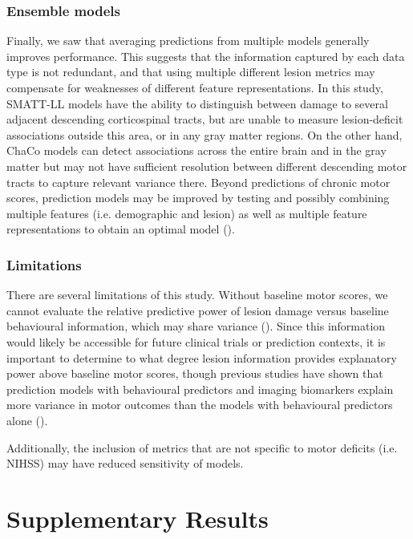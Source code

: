 \documentclass[10pt]{article}
\begin{document}
\subsubsection*{Ensemble models}
Finally, we saw that averaging predictions from multiple models generally improves performance. This suggests that the information captured by each data type is not redundant, and that using multiple different lesion metrics may compensate for weaknesses of different feature representations. In this study, SMATT-LL models have the ability to distinguish between damage to several adjacent descending corticospinal tracts, but are unable to measure lesion-deficit associations outside this area, or in any gray matter regions. On the other hand, ChaCo models can detect associations across the entire brain and in the gray matter but may not have sufficient resolution between different descending motor tracts to capture relevant variance there. Beyond predictions of chronic motor scores, prediction models may be improved by testing and possibly combining multiple features (i.e. demographic and lesion) as well as multiple feature representations to obtain an optimal model (\cite{Kasties2021-rm, Park2022-nt}).

\subsubsection*{Limitations}
There are several limitations of this study. Without baseline motor scores, we cannot evaluate the relative predictive power of lesion damage versus baseline behavioural information, which may share variance (\cite{Feng2015-du, Bowren2022-rs}). Since this information would likely be accessible for future clinical trials or prediction contexts, it is important to determine to what degree lesion information provides explanatory power above baseline motor scores, though previous studies have shown that prediction models with behavioural predictors and imaging biomarkers explain more variance in motor outcomes than the models with behavioural predictors alone (\cite{Kim2017-xe, Feng2015-du}). 

Additionally, the inclusion of metrics that are not specific to motor deficits (i.e. NIHSS) may have reduced sensitivity of models. 

\clearpage



\printbibliography
\section*{Supplementary Results}
\end{document}
